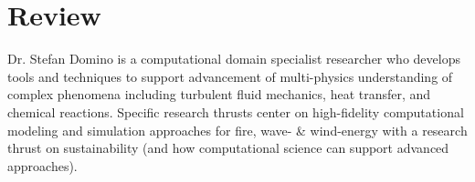 \documentclass[letterpaper]{twentysecondcv_spd} %
\begin{document}
\begin{twentysingle} 

	
\end{twentysingle}

\section{Review}

Dr. Stefan Domino is a computational domain specialist researcher who develops tools and techniques
to support advancement of multi-physics understanding of complex phenomena including turbulent 
fluid mechanics, heat transfer, and chemical reactions. Specific research thrusts center on high-fidelity
computational modeling and simulation approaches for fire, wave- \& wind-energy with a research thrust on sustainability (and how computational science can support advanced approaches).
\end{document}
